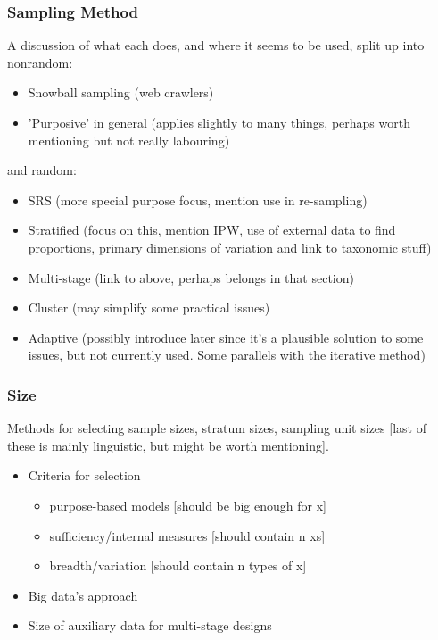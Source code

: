 \subsubsection{Sampling Method}
A discussion of what each does, and where it seems to be used, split up into nonrandom:

\begin{itemize}
 \item Snowball sampling (web crawlers)
 \item 'Purposive' in general (applies slightly to many things, perhaps worth mentioning but not really labouring)
\end{itemize}

and random:

\begin{itemize}
 \item SRS (more special purpose focus, mention use in re-sampling)
 \item Stratified (focus on this, mention IPW, use of external data to find proportions, primary dimensions of variation and link to taxonomic stuff)
 \item Multi-stage (link to above, perhaps belongs in that section)
 \item Cluster (may simplify some practical issues)
 \item Adaptive (possibly introduce later since it's a plausible solution to some issues, but not currently used.  Some parallels with the iterative method)
\end{itemize}


\subsubsection{Size}
Methods for selecting sample sizes, stratum sizes, sampling unit sizes [last of these is mainly linguistic, but might be worth mentioning].

\begin{itemize}
 \item Criteria for selection
    \begin{itemize}
    \item purpose-based models [should be big enough for x]
    \item sufficiency/internal measures [should contain n xs]
    \item breadth/variation [should contain n types of x]
    \end{itemize}
 \item Big data's approach
 \item Size of auxiliary data for multi-stage designs
\end{itemize}


